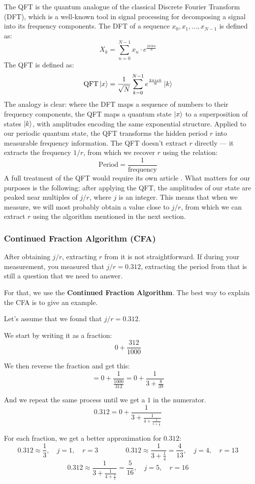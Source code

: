 The QFT is the quantum analogue of the classical Discrete Fourier Transform
(DFT), which is a well-known tool in signal processing for decomposing a
signal into its frequency components. The DFT of a sequence
$x_0, x_1, \ldots, x_{N-1}$ is defined as:
$$
X_k = \sum_{n=0}^{N-1} x_n \cdot e^{\frac{2\pi i k n}{N}}
$$
The QFT is defined as:
$$
\text{QFT} \ket{x} = \frac{1}{\sqrt{N}} \sum_{k=0}^{N-1}
e^{\frac{2\pi i x k}{N}} \ket{k}
$$
The analogy is clear: where the DFT maps a sequence of numbers to their
frequency components, the QFT maps a quantum state $\ket{x}$ to a
superposition of states $\ket{k}$, with amplitudes encoding the same
exponential structure. Applied to our periodic quantum state, the QFT
transforms the hidden period $r$ into measurable frequency information. The
QFT doesn't extract $r$ directly --- it extracts the frequency $1/r$, from
which we recover $r$ using the relation:
$$
\text{Period} = \frac{1}{\text{frequency}}
$$
A full treatment of the QFT would require its own article \cite{nielsen2010}.
What matters for our purposes is the following: after applying the QFT, the
amplitudes of our state are peaked near multiples of $j/r$, where $j$ is an
integer. This means that when we measure, we will most probably obtain a value
close to $j/r$, from which we can extract $r$ using the algorithm mentioned
in the next section.

\subsubsection{Continued Fraction Algorithm (CFA)}

After obtaining $j/r$, extracting $r$ from it is not straightforward. If
during your measurement, you measured that $j/r = 0.312$, extracting the
period from that is still a question that we need to answer.

For that, we use the \textbf{Continued Fraction Algorithm}. The best way to
explain the CFA is to give an example.

Let's assume that we found that $j/r = 0.312$.

We start by writing it as a fraction:
$$
0 + \frac{312}{1000}
$$

We then reverse the fraction and get this:
$$
= 0 + \frac{1}{\frac{1000}{312}} = 0 + \frac{1}{3 + \frac{8}{39}}
$$

And we repeat the same process until we get a $1$ in the numerator.
$$
0.312 = 0 + \frac{1}{3 + \frac{1}{4 + \frac{1}{1 + \frac{1}{7}}}}
$$

For each fraction, we get a better approximation for $0.312$:
$$
0.312 \approx \frac{1}{3}, \quad j = 1, \quad r = 3 \qquad \qquad 0.312 \approx \frac{1}{3 + \frac{1}{4}} = \frac{4}{13}, \quad j = 4, \quad r = 13
$$
$$
0.312 \approx \frac{1}{3 + \frac{1}{4 + \frac{1}{1}}} = \frac{5}{16},
\quad j = 5, \quad r = 16
$$

